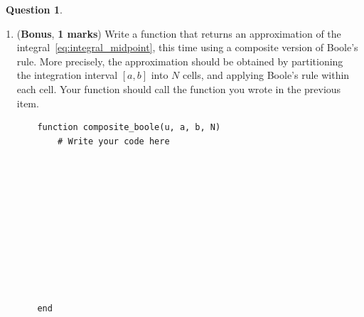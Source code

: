 \documentclass[10pt]{article}
\theoremstyle{definition}
\newtheorem{question}{{\normalfont \faGears}~Question}
\renewcommand{\mymarks}[1]{\textbf{#1 marks}}
\begin{document}
\begin{question}
\begin{enumerate}
\begin{verbatim}
    end
            \end{verbatim}
        \item
            (\textbf{Bonus}, \mymarks{1})
            Write a function 
            that returns an approximation of the integral~\eqref{eq:integral_midpoint},
            this time using a composite version of Boole's rule.
            More precisely, the approximation should be obtained
            by partitioning the integration interval $[a, b]$ into $N$ cells,
            and applying Boole's rule within each cell.
            Your function should call the function  you wrote in the previous item.

            \begin{verbatim}
    function composite_boole(u, a, b, N)
        # Write your code here











    end
            \end{verbatim}
    \end{enumerate}
\end{question}
\end{document}
